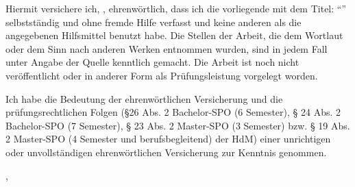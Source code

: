 \thispagestyle{empty}
\noindent
Hiermit versichere ich, \getAuthor{}, ehrenwörtlich, dass ich die vorliegende \getDoctype{} mit dem Titel: ``\getTitle{}'' selbstständig 
und ohne fremde Hilfe verfasst und keine anderen als die angegebenen Hilfsmittel benutzt habe. Die Stellen der Arbeit, die dem Wortlaut 
oder dem Sinn nach anderen Werken entnommen wurden, sind in jedem Fall unter Angabe der Quelle kenntlich gemacht. Die Arbeit ist noch nicht 
veröffentlicht oder in anderer Form als Prüfungsleistung vorgelegt worden.

\vspace*{5mm}
\noindent
Ich habe die Bedeutung der ehrenwörtlichen Versicherung und die prüfungsrechtlichen Folgen 
(§26 Abs. 2 Bachelor-SPO (6 Semester), § 24 Abs. 2 Bachelor-SPO (7 Semester), § 23 Abs. 2 Master-SPO (3 Semester) bzw. § 19 Abs. 2 Master-SPO (4 Semester und berufsbegleitend) 
der HdM) einer unrichtigen oder unvollständigen ehrenwörtlichen Versicherung zur Kenntnis genommen.

\vspace{15mm}
\noindent
\getSubmissionLocation{}, \getSubmissionDate{} \hspace{50mm} \getAuthor{}

\cleardoublepage{}

